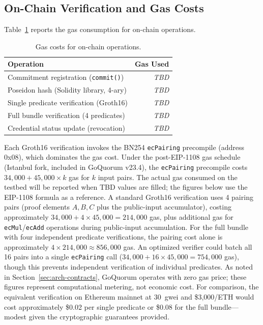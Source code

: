 \subsection{On-Chain Verification and Gas Costs}
\label{sec:eval-gas}

Table~\ref{tab:gas} reports the gas consumption for on-chain operations.

\begin{table}[t]
\centering
\caption{Gas costs for on-chain operations.}
\label{tab:gas}
\begin{tabular}{lr}
\toprule
\textbf{Operation} & \textbf{Gas Used} \\
\midrule
Commitment registration (\texttt{commit()}) & \textit{TBD} \\
Poseidon hash (Solidity library, 4-ary) & \textit{TBD} \\
Single predicate verification (Groth16) & \textit{TBD} \\
Full bundle verification (4 predicates) & \textit{TBD} \\
Credential status update (revocation) & \textit{TBD} \\
\bottomrule
\end{tabular}
\end{table}

Each Groth16 verification invokes the BN254 \texttt{ecPairing} precompile (address 0x08), which dominates the gas cost.
Under the post-EIP-1108 gas schedule (Istanbul fork, included in GoQuorum v23.4), the \texttt{ecPairing} precompile costs $34{,}000 + 45{,}000 \times k$ gas for $k$ input pairs.
The actual gas consumed on the testbed will be reported when TBD values are filled; the figures below use the EIP-1108 formula as a reference.
A standard Groth16 verification uses 4 pairing pairs (proof elements $A, B, C$ plus the public-input accumulator), costing approximately $34{,}000 + 4 \times 45{,}000 = 214{,}000$ gas, plus additional gas for \texttt{ecMul}/\texttt{ecAdd} operations during public-input accumulation.
For the full bundle with four independent predicate verifications, the pairing cost alone is approximately $4 \times 214{,}000 \approx 856{,}000$ gas.
An optimized verifier could batch all 16 pairs into a single \texttt{ecPairing} call ($34{,}000 + 16 \times 45{,}000 = 754{,}000$ gas), though this prevents independent verification of individual predicates.
As noted in Section~\ref{sec:arch-contracts}, GoQuorum operates with zero gas price; these figures represent computational metering, not economic cost.
For comparison, the equivalent verification on Ethereum mainnet at 30~gwei and \$3{,}000/ETH would cost approximately \$0.02 per single predicate or \$0.08 for the full bundle---modest given the cryptographic guarantees provided.

